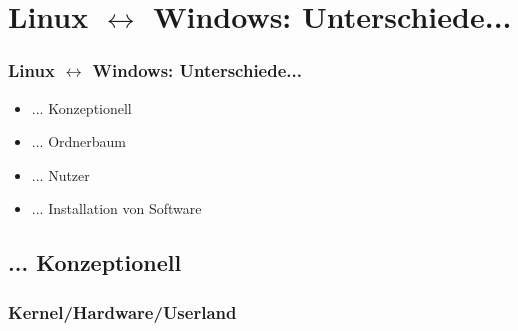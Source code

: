 \documentclass{beamer}
\begin{document}
    \section{Linux $\leftrightarrow$ Windows: Unterschiede...}
        \begin{frame}
      		\frametitle{Linux $\leftrightarrow$ Windows: Unterschiede...}
        		\begin{center}
            		\begin{minipage}{0.44\textwidth}
            		    \begin{itemize}
            		        \item ... Konzeptionell
            		        \item ... Ordnerbaum
            		        \item ... Nutzer
            		        \item ... Installation von Software
            		    \end{itemize}
            		\end{minipage}%
        		\end{center}
    	\end{frame}
        \subsection{... Konzeptionell}
            \begin{frame}
          		\frametitle{Kernel/Hardware/Userland}
        		\begin{minipage}{0.44\textwidth}
        		
        		\end{minipage}%
        		\begin{minipage}{0.54\textwidth}
        		
        		\end{minipage}
        	\end{frame}
        	
\end{document}
